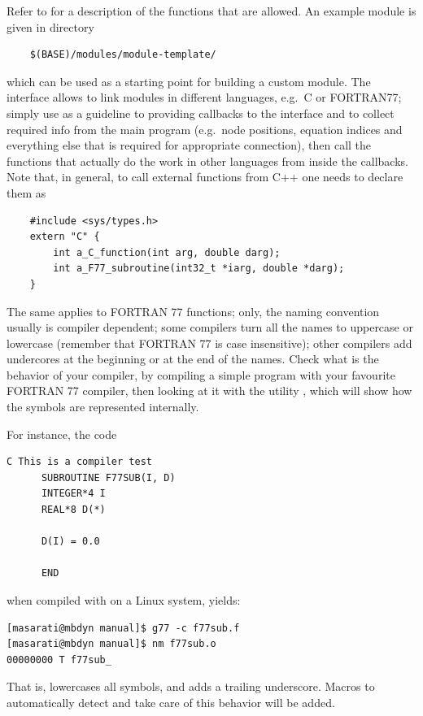 \noindent
Refer to  for a description of the
functions that are allowed.
An example module is given in directory
\begin{verbatim}
    $(BASE)/modules/module-template/
\end{verbatim}
which can be used as a starting point for building a custom module.
The  interface allows to link modules in different
languages, e.g.\ C or FORTRAN77; simply use 
as a guideline to providing callbacks to the 
interface and to collect required info from the main program
(e.g.\ node positions, equation indices and everything else that is
required for appropriate connection), then call the functions that
actually do the work in other languages from inside the callbacks.
Note that, in general, to call external functions from C++ one needs
to declare them as
\begin{verbatim}
    #include <sys/types.h>
    extern "C" {
        int a_C_function(int arg, double darg);
        int a_F77_subroutine(int32_t *iarg, double *darg);
    }
\end{verbatim}
The same applies to FORTRAN 77 functions; only, the naming convention
usually is compiler dependent; some compilers turn all the names to 
uppercase or lowercase (remember that FORTRAN 77 is case insensitive);
other compilers add undercores at the beginning or at the end of the
names.
Check what is the behavior of your compiler, by compiling a simple 
program with your favourite FORTRAN 77 compiler, then looking at it
with the utility , which will show how the symbols are represented 
internally.

\noindent
For instance, the code
\begin{verbatim}
C This is a compiler test
      SUBROUTINE F77SUB(I, D)
      INTEGER*4 I
      REAL*8 D(*)

      D(I) = 0.0

      END
\end{verbatim}
when compiled with  on a Linux system, yields:
\begin{verbatim}
[masarati@mbdyn manual]$ g77 -c f77sub.f
[masarati@mbdyn manual]$ nm f77sub.o
00000000 T f77sub_
\end{verbatim}
That is,  lowercases all symbols, and adds a trailing 
underscore.
Macros to automatically detect and take care of this behavior 
will be added.



